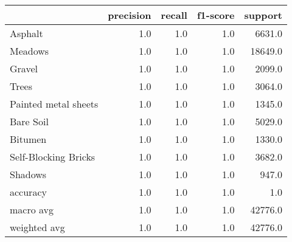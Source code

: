 \begin{tabular}{lrrrr}
\toprule
{} &  precision &  recall &  f1-score &  support \\
\midrule
Asphalt              &        1.0 &     1.0 &       1.0 &   6631.0 \\
Meadows              &        1.0 &     1.0 &       1.0 &  18649.0 \\
Gravel               &        1.0 &     1.0 &       1.0 &   2099.0 \\
Trees                &        1.0 &     1.0 &       1.0 &   3064.0 \\
Painted metal sheets &        1.0 &     1.0 &       1.0 &   1345.0 \\
Bare Soil            &        1.0 &     1.0 &       1.0 &   5029.0 \\
Bitumen              &        1.0 &     1.0 &       1.0 &   1330.0 \\
Self-Blocking Bricks &        1.0 &     1.0 &       1.0 &   3682.0 \\
Shadows              &        1.0 &     1.0 &       1.0 &    947.0 \\
accuracy             &        1.0 &     1.0 &       1.0 &      1.0 \\
macro avg            &        1.0 &     1.0 &       1.0 &  42776.0 \\
weighted avg         &        1.0 &     1.0 &       1.0 &  42776.0 \\
\bottomrule
\end{tabular}
